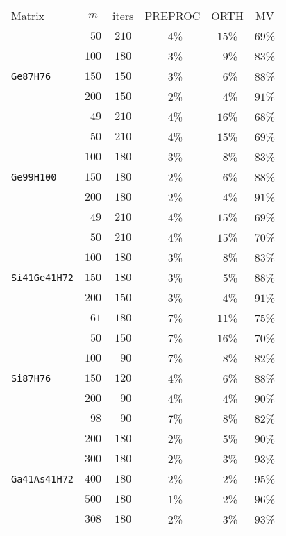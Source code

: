 \begin{tabular}{l|c|c|c|c|c}
\hline
\multirow{2}{*}{Matrix} & \multirow{2}{*}{$m$} & \multirow{2}{*}{iters} & \multirow{2}{*}{PREPROC} & \multirow{2}{*}{ORTH} & \multirow{2}{*}{MV} \\
 & & & & & \\\hline
\hline
  & $\phantom{0}50$ & $210$ & $\phantom{0}4$\% & $15$\% & $69$\%\\
  & $100$ & $180$ & $\phantom{0}3$\% & $\phantom{0}9$\% & $83$\%\\
\verb|Ge87H76| & $150$ & $150$ & $\phantom{0}3$\% & $\phantom{0}6$\% & $88$\%\\\hline
  & $200$ & $150$ & $\phantom{0}2$\% & $\phantom{0}4$\% & $91$\%\\
  & $\phantom{0}49$ & $210$ & $\phantom{0}4$\% & $16$\% & $68$\%\\
  & $\phantom{0}50$ & $210$ & $\phantom{0}4$\% & $15$\% & $69$\%\\
  & $100$ & $180$ & $\phantom{0}3$\% & $\phantom{0}8$\% & $83$\%\\
\verb|Ge99H100| & $150$ & $180$ & $\phantom{0}2$\% & $\phantom{0}6$\% & $88$\%\\\hline
  & $200$ & $180$ & $\phantom{0}2$\% & $\phantom{0}4$\% & $91$\%\\
  & $\phantom{0}49$ & $210$ & $\phantom{0}4$\% & $15$\% & $69$\%\\
  & $\phantom{0}50$ & $210$ & $\phantom{0}4$\% & $15$\% & $70$\%\\
  & $100$ & $180$ & $\phantom{0}3$\% & $\phantom{0}8$\% & $83$\%\\
\verb|Si41Ge41H72| & $150$ & $180$ & $\phantom{0}3$\% & $\phantom{0}5$\% & $88$\%\\\hline
  & $200$ & $150$ & $\phantom{0}3$\% & $\phantom{0}4$\% & $91$\%\\
  & $\phantom{0}61$ & $180$ & $\phantom{0}7$\% & $11$\% & $75$\%\\
  & $\phantom{0}50$ & $150$ & $\phantom{0}7$\% & $16$\% & $70$\%\\
  & $100$ & $\phantom{0}90$ & $\phantom{0}7$\% & $\phantom{0}8$\% & $82$\%\\
\verb|Si87H76| & $150$ & $120$ & $\phantom{0}4$\% & $\phantom{0}6$\% & $88$\%\\\hline
  & $200$ & $\phantom{0}90$ & $\phantom{0}4$\% & $\phantom{0}4$\% & $90$\%\\
  & $\phantom{0}98$ & $\phantom{0}90$ & $\phantom{0}7$\% & $\phantom{0}8$\% & $82$\%\\
  & $200$ & $180$ & $\phantom{0}2$\% & $\phantom{0}5$\% & $90$\%\\
  & $300$ & $180$ & $\phantom{0}2$\% & $\phantom{0}3$\% & $93$\%\\
\verb|Ga41As41H72| & $400$ & $180$ & $\phantom{0}2$\% & $\phantom{0}2$\% & $95$\%\\\hline
  & $500$ & $180$ & $\phantom{0}1$\% & $\phantom{0}2$\% & $96$\%\\
  & $308$ & $180$ & $\phantom{0}2$\% & $\phantom{0}3$\% & $93$\%\\
\end{tabular}